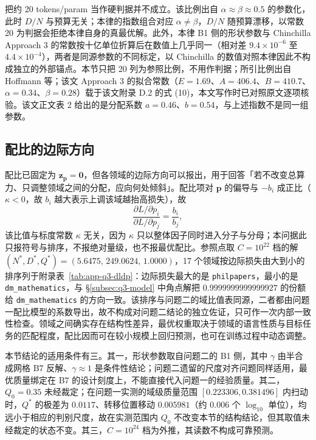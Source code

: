 把约 20 tokens/param 当作硬判据并不成立。该比例出自 $\alpha\approx\beta\approx0.5$ 的参数化，此时 $D/N$ 与预算无关；本律的指数组合对应 $\alpha\ne\beta$，$D/N$ 随预算漂移，以常数 20 为判据会拒绝本律自身的真最优解。此外，本律 B1 侧的形状参数与 Chinchilla Approach 3 的常数按十亿单位折算后在数值上几乎同一（相对差 $9.4\times10^{-6}$ 至 $4.4\times10^{-4}$），两者是同源参数的不同标定，以 Chinchilla 的数值对照本律因此不构成独立的外部锚点。本节只把 20 列为参照比例，不用作判据；所引比例出自 Hoffmann 等\citep{hoffmann2022}；该文 Approach 3 的拟合常数（$E=1.69$、$A=406.4$、$B=410.7$、$\alpha=0.34$、$\beta=0.28$）载于该文附录 D.2 的式 (10)，本文写作时已对照原文逐项核验。该文正文表 2 给出的是分配系数 $a=0.46$、$b=0.54$，与上述指数不是同一组参数。

\subsection{配比的边际方向}
\label{subsec:q3-direction}

配比已固定为 $\boldsymbol{z}_{\boldsymbol{p}}=\boldsymbol{0}$，但各领域的边际方向可以报出，用于回答「若不改变总算力、只调整领域之间的分配，应向何处倾斜」。配比项对 $\boldsymbol{p}$ 的偏导与 $-b_i$ 成正比（$\kappa<0$，故 $b_i$ 越大表示上调该域越抬高损失），故
\begin{equation}
  \frac{\partial L/\partial p_i}{\partial L/\partial p_j}=\frac{b_i}{b_j},
  \label{eq:q3-dldp}
\end{equation}
该比值与标度常数 $\kappa$ 无关，因为 $\kappa$ 只以整体因子同时进入分子与分母；本问据此只报符号与排序，不报绝对量级，也不报最优配比。参照点取 $C=10^{22}$ 档的解 $(N^{*},D^{*},Q^{*})=(5.6475,\,249.0624,\,1.0000)$，17 个领域按边际损失由大到小的排序列于附录表~\ref{tab:app-q3-dldp}：边际损失最大的是 \texttt{philpapers}，最小的是 \texttt{dm\_mathematics}，与 \S\ref{subsec:q3-model} 中角点解把 $0.9999999999999927$ 的份额给 \texttt{dm\_mathematics} 的方向一致。该排序与问题二的域比值表同源，二者都由问题一配比模型的系数导出，故不构成对问题二结论的独立佐证，只可作一次内部一致性检查。领域之间确实存在结构性差异，最优权重取决于领域的语言性质与目标任务的匹配程度，配比因而可在较小规模上回归预测\citep{liu2024regmix}，也可在训练过程中动态调整\citep{xie2023doremi}。

本节结论的适用条件有三。其一，形状参数取自问题二的 B1 侧，其中 $\gamma$ 由半合成网格 B7 反解、$\gamma\approx1$ 是条件性结论；问题二遗留的尺度对齐问题同样适用，最优质量绑定在 B7 的设计刻度上，不能直接代入问题一的经验质量。其二，$Q_0=0.35$ 未经裁定；在问题一实测的域级质量范围 $[0.223306,0.381496]$ 内扫动时，$Q^{*}$ 的极差为 $0.0117$、转移位置移动 $0.005981$（约 $0.006$ 个 $\log_{10}$ 单位），均远小于相应的判别尺度，故在实测范围内 $Q_0$ 不改变本节的结构结论，但其取值未经裁定的状态不变。其三，$C=10^{24}$ 档为外推，其读数不构成可靠预测。
